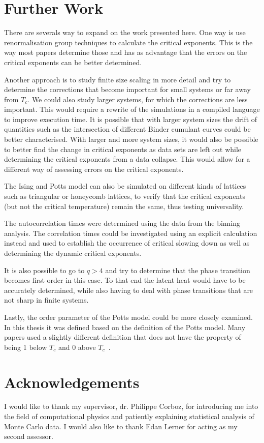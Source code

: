 \documentclass[11pt, a4paper]{report} %
\begin{document}
\section{Further Work}
There are severals way to expand on the work presented here.
One way is use renormalisation group techniques to calculate the critical exponents.
This is the way most papers determine those and has as advantage that the errors on the critical exponents can be better determined.

Another approach is to study finite size scaling in more detail and try to determine the corrections that become important for small systems or far away from \(T_c\).
We could also study larger systems, for which the corrections are less important.
This would require a rewrite of the simulations in a compiled language to improve execution time.
It is possible that with larger system sizes the drift of quantities such as the intersection of different Binder cumulant curves could be better characterised.
With larger and more system sizes, it would also be possible to better find the change in critical exponents as data sets are left out while determining the critical exponents from a data collapse.
This would allow for a different way of assessing errors on the critical exponents.

The Ising and Potts model can also be simulated on different kinds of lattices such as triangular or honeycomb lattices, to verify that the critical exponents (but not the critical temperature) remain the same, thus testing universality.

The autocorrelation times were determined using the data from the binning analysis.
The correlation times could be investigated using an explicit calculation instead and used to establish the occurrence of critical slowing down as well as determining the dynamic critical exponents.

It is also possible to go to \(q > 4\) and try to determine that the phase transition becomes first order in this case.
To that end the latent heat would have to be accurately determined, while also having to deal with phase transitions that are not sharp in finite systems.

Lastly, the order parameter of the Potts model could be more closely examined.
In this thesis it was defined based on the definition of the Potts model.
Many papers used a slightly different definition that does not have the property of being 1 below \(T_c\) and 0 above \(T_c\)~\cite{binder:1981a,wu:1982,fan:2007}.

\section{Acknowledgements}
I would like to thank my supervisor, dr. Philippe Corboz, for introducing me into the field of computational physics and patiently explaining statistical analysis of Monte Carlo data.
I would also like to thank Edan Lerner for acting as my second assessor.


\printbibliography
\end{document}
